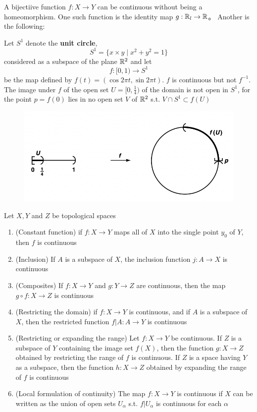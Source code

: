 \documentclass[11pt]{article}
\begin{document}
\begin{examplle}[]
A bijectiive function \(f:X\to Y\) can be continuous without being a homeomorphism. One such
function is the identity map \(g:\mathbb{R}_l\to\mathbb{R}\)。 Another is the following:

Let \(S^1\) denote the \textbf{unit circle},
\begin{equation*}
S^1=\{x\times y\mid x^2+y^2=1\}
\end{equation*}
considered as a subspace of the plane \(\mathbb{R}^2\) and let
\begin{equation*}
f:[0,1)\to S^1
\end{equation*}
be the map defined by \(f(t)=(\cos 2\pi t,\sin2\pi t)\). \(f\) is continuous but not \(f^{-1}\). The
image under \(f\) of the open set \(U=[0,\frac{1}{4})\) of the domain is not open in \(S^1\), for
the point \(p=f(0)\) lies in no open set \(V\) of \(\mathbb{R}^2\) s.t. \(V\cap S^1\subset f(U)\)

\begin{figure}[htbp]
\centering
\includegraphics[width=.7\textwidth]{../images/Topology/3.png}
\label{}
\end{figure}
\end{examplle}


\begin{theorem}
Let \(X,Y\) and \(Z\) be topological spaces
\begin{enumerate}
\item (Constant function) if \(f:X\to Y\) maps all of \(X\) into the single point \(y_0\) of \(Y\),
then \(f\) is continuous
\item (Inclusion) If \(A\) is a subspace of \(X\), the inclusion function \(j:A\to X\) is continuous
\item (Composites) If \(f:X\to Y\) and \(g:Y\to Z\) are continuous, then the map \(g\circ f:X\to Z\) is continuous
\item (Restricting the domain) if \(f:X\to Y\) is continuous, and if \(A\) is a subspace of \(X\),
then the restricted function \(f|A:A\to Y\) is continuous
\item (Restricting or expanding the range) Let \(f:X\to Y\) be continuous. If \(Z\) is a subspace
of \(Y\) containing the image set \(f(X)\), then the function \(g:X\to Z\) obtained by
restricting the range of \(f\) is continuous. If \(Z\) is a space having \(Y\) as a subspace,
then the function \(h:X\to Z\) obtained by expanding the range of \(f\) is continuous
\item (Local formulation of continuity) The map \(f:X\to Y\) is continuous if \(X\) can be written as
the union of open sets \(U_\alpha\) s.t. \(f|U_\alpha\) is continuous for each \(\alpha\)
\end{enumerate}
\end{theorem}
\end{document}
